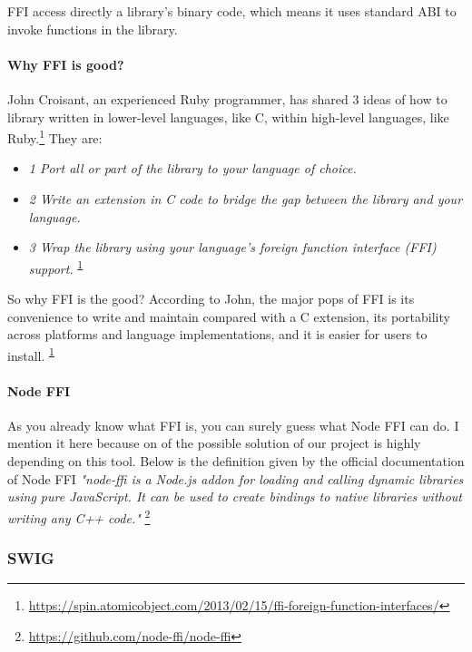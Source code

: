             FFI access directly a library's binary code, which means it uses standard ABI to invoke functions in the library.
            
            \paragraph{Why FFI is good?} John Croisant, an experienced Ruby programmer, has shared 3 ideas of how to library written in lower-level languages, like C, within high-level languages, like Ruby.\footnote{\label{note1}\url{https://spin.atomicobject.com/2013/02/15/ffi-foreign-function-interfaces/}} They are:\newline
           
                \begin{itemize} 
                    \item \textit{1 Port all or part of the library to your language of choice.}
                    \item \textit{2 Write an extension in C code to bridge the gap between the library and your language.}
                    \item \textit{3 Wrap the library using your language's foreign function interface (FFI) support. }
                   \textsuperscript{\ref{note1}}\newline
                \end{itemize}
            
            So why FFI is the good? According to John, the major pops of FFI is its convenience to write and maintain compared with a C extension, its portability across platforms and language implementations, and it is easier for users to install. \textsuperscript{\ref{note1}}
            
            
            \paragraph{Node FFI}
            As you already know what FFI is, you can surely guess what Node FFI can do. I mention it here because on of the possible solution of our project is highly depending on this tool. Below is the definition given by the official documentation of Node FFI \textit{"node-ffi is a Node.js addon for loading and calling dynamic libraries using pure JavaScript. It can be used to create bindings to native libraries without writing any C++ code."} \footnote{\url{https://github.com/node-ffi/node-ffi}}


        \subsubsection{SWIG}
